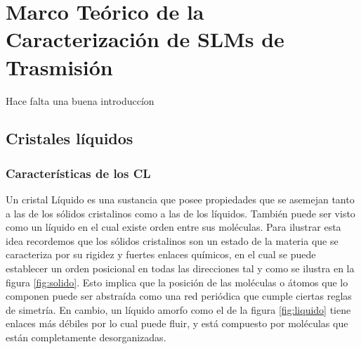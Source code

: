 \section{Marco Teórico de la Caracterización de SLMs de Trasmisión}
\label{sec:ChGen_marco_teorico}

Hace falta una buena introduccíon

\subsection{Cristales líquidos}
\subsubsection{Características de los CL}  
Un cristal Líquido es una sustancia que posee propiedades que
se asemejan tanto a las de los sólidos cristalinos como a las de los
líquidos. También puede ser visto como un líquido en el cual existe
orden entre sus moléculas. Para ilustrar esta idea recordemos que los
sólidos cristalinos son un estado de la materia que se caracteriza por
su rigidez y fuertes enlaces químicos, en el cual se puede
establecer un orden posicional en todas las direcciones tal y como se
ilustra en la figura \ref{fig:solido}. Esto implica que la posición de
las moléculas o átomos que lo componen puede ser abstraída como una
red periódica que cumple ciertas reglas de simetría. En cambio, un
líquido amorfo como el de la figura \ref{fig:liquido} tiene enlaces
más débiles por lo cual puede fluir, y está compuesto
por moléculas que están completamente desorganizadas. 
